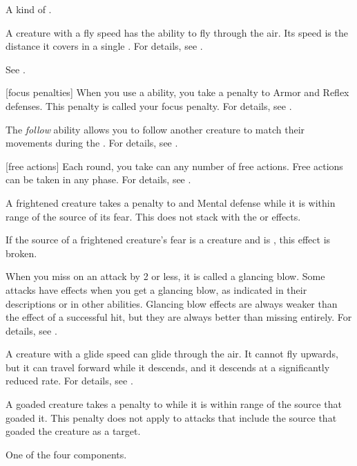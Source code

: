  A kind of .

 A creature with a fly speed has the ability to fly through the air.
Its speed is the distance it covers in a single .
For details, see .

 See .

[focus penalties] When you use a  ability, you take a  penalty to Armor and Reflex defenses.
This penalty is called your focus penalty.
For details, see .

 The \textit{follow} ability allows you to follow another creature to match their movements during the .
For details, see .

[free actions] Each round, you take can any number of free actions.
Free actions can be taken in any phase.
For details, see .

 A frightened creature takes a  penalty to  and Mental defense while it is within \rngmed range of the source of its fear.
This does not stack with the  or  effects.

If the source of a frightened creature's fear is a creature and is , this effect is broken.

 When you miss on an attack by 2 or less, it is called a glancing blow.
Some attacks have effects when you get a glancing blow, as indicated in their descriptions or in other abilities.
Glancing blow effects are always weaker than the effect of a successful hit, but they are always better than missing entirely.
For details, see .

 A creature with a glide speed can glide through the air.
It cannot fly upwards, but it can travel forward while it descends, and it descends at a significantly reduced rate.
For details, see .

 A goaded creature takes a  penalty to  while it is within \rngclose range of the source that goaded it.
This penalty does not apply to attacks that include the source that goaded the creature as a target.

 One of the four  components.

